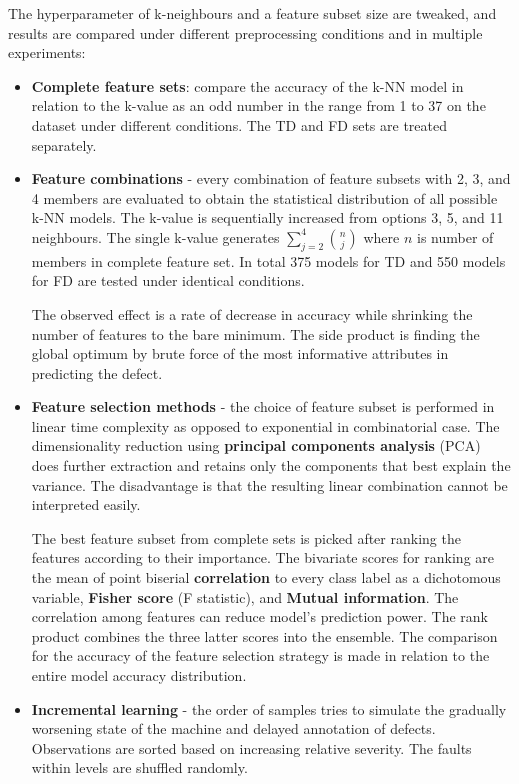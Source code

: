 The hyperparameter of k-neighbours and a feature subset size are tweaked, and results are compared under different preprocessing conditions and in multiple experiments:

\begin{itemize}
\itemsep0pt
\item \textbf{Complete feature sets}: compare the accuracy of the k-NN model in relation to the k-value as an odd number in the range from 1 to 37 on the dataset under different conditions. The TD and FD sets are treated separately.

\item \textbf{Feature combinations} - every combination of feature subsets with 2, 3, and 4 members are evaluated to obtain the statistical distribution of all possible k-NN models. The k-value is sequentially increased from options 3, 5, and 11 neighbours. The single k-value generates $\sum_{j=2}^{4}{\binom{n}{j}}$ where $n$ is number of members in complete feature set. In total 375 models for TD and 550 models for FD are tested under identical conditions. 

The observed effect is a rate of decrease in accuracy while shrinking the number of features to the bare minimum. The side product is finding the global optimum by brute force of the most informative attributes in predicting the defect.

\item \textbf{Feature selection methods} - the choice of feature subset is performed in linear time complexity as opposed to exponential in combinatorial case. The dimensionality reduction using \textbf{principal components analysis} (PCA) does further extraction and retains only the components that best explain the variance. The disadvantage is that the resulting linear combination cannot be interpreted easily. 

The best feature subset from complete sets is picked after ranking the features according to their importance. The bivariate scores for ranking are the mean of point biserial \textbf{correlation} to every class label as a dichotomous variable, \textbf{Fisher score} (F statistic), and \textbf{Mutual information}. The correlation among features can reduce model's prediction power. The rank product combines the three latter scores into the ensemble. The comparison for the accuracy of the feature selection strategy is made in relation to the entire model accuracy distribution. 

\item \textbf{Incremental learning} - the order of samples tries to simulate the gradually worsening state of the machine and delayed annotation of defects. Observations are sorted based on increasing relative severity. The faults within levels are shuffled randomly. 


\end{itemize}
